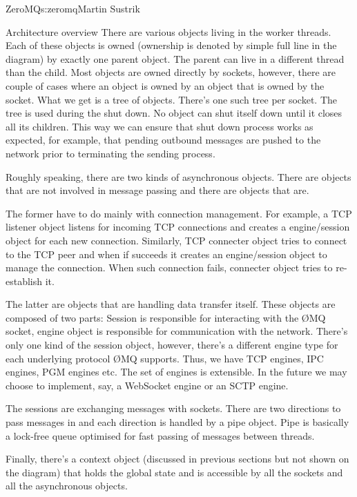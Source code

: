\begin{aosachapter}{ZeroMQ}{s:zeromq}{Martin Sustrik}
\begin{aosasect1}{Architecture overview}
There are various objects living in the worker threads. Each of these
objects is owned (ownership is denoted by simple full line in the
diagram) by exactly one parent object. The parent can live in a
different thread than the child. Most objects are owned directly by
sockets, however, there are couple of cases where an object is owned
by an object that is owned by the socket. What we get is a tree of
objects. There's one such tree per socket. The tree is used during the
shut down. No object can shut itself down until it closes all its
children. This way we can ensure that shut down process works as
expected, for example, that pending outbound messages are pushed to
the network prior to terminating the sending process.

Roughly speaking, there are two kinds of asynchronous objects. There
are objects that are not involved in message passing and there are
objects that are.

The former have to do mainly with connection management. For example,
a TCP listener object listens for incoming TCP connections and creates
a engine/session object for each new connection. Similarly, TCP
connecter object tries to connect to the TCP peer and when if succeeds
it creates an engine/session object to manage the connection. When
such connection fails, connecter object tries to re-establish it.

The latter are objects that are handling data transfer itself. These
objects are composed of two parts: Session is responsible for
interacting with the {\O}MQ socket, engine object is responsible for
communication with the network. There's only one kind of the session
object, however, there's a different engine type for each underlying
protocol {\O}MQ supports. Thus, we have TCP engines, IPC engines, PGM
engines etc. The set of engines is extensible. In the future we may
choose to implement, say, a WebSocket engine or an SCTP engine.

The sessions are exchanging messages with sockets. There are two
directions to pass messages in and each direction is handled by a pipe
object. Pipe is basically a lock-free queue optimised for fast passing
of messages between threads.

Finally, there's a context object (discussed in previous sections but
not shown on the diagram) that holds the global state and is
accessible by all the sockets and all the asynchronous objects.

\end{aosasect1}


\end{aosachapter}
